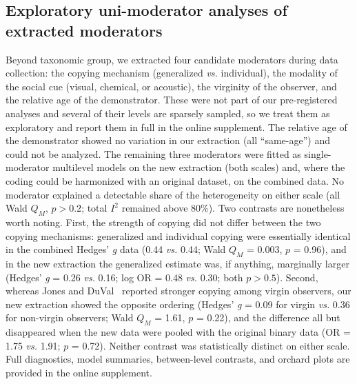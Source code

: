 

\subsection{Exploratory uni-moderator analyses of extracted moderators}

Beyond taxonomic group, we extracted four candidate moderators during data
collection: the copying mechanism (generalized \textit{vs.} individual), the
modality of the social cue (visual, chemical, or acoustic), the virginity of the
observer, and the relative age of the demonstrator. These were not part of our
pre-registered analyses and several of their levels are sparsely sampled, so we
treat them as exploratory and report them in full in the online supplement.
The relative age of the demonstrator showed no variation in our extraction (all
``same-age'') and could not be analyzed. The remaining three moderators were fitted
as single-moderator multilevel models on the new extraction (both scales) and,
where the coding could be harmonized with an original dataset, on the combined
data. No moderator explained a detectable share of the heterogeneity on either
scale (all Wald $Q_M$, $p > 0.2$; total $I^2$ remained above 80\%). Two contrasts
are nonetheless worth noting. First, the strength of copying did not differ
between the two copying mechanisms: generalized and individual copying were
essentially identical in the combined Hedges' \textit{g} data (0.44 \textit{vs.}
0.44; Wald $Q_M$ = 0.003, $p$ = 0.96), and in the new extraction the generalized
estimate was, if anything, marginally larger (Hedges' \textit{g} = 0.26
\textit{vs.} 0.16; log OR = 0.48 \textit{vs.} 0.30; both $p > 0.5$). Second,
whereas Jones and DuVal~\cite{jonesMechanismsSocialInfluence2019} reported
stronger copying among virgin observers, our new extraction showed the opposite
ordering (Hedges' \textit{g} = 0.09 for virgin \textit{vs.} 0.36 for non-virgin
observers; Wald $Q_M$ = 1.61, $p$ = 0.22), and the difference all but disappeared
when the new data were pooled with the original binary data (OR = 1.75
\textit{vs.} 1.91; $p$ = 0.72). Neither contrast was statistically distinct on
either scale. Full diagnostics, model summaries, between-level contrasts, and
orchard plots are provided in the online supplement.


